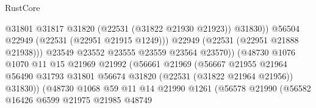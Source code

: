 \begin{lexlean}{RustCore}
\begin{coremodule}
                                                  @31801
                                                  @31817
                                                  @31820
                                                  (@22531 (@31822 @21930 @21923))
                                                  @31830))
                                              @56504
                                              @22949
                                              (@22531 (@22951 @21915 @1249)))
                                            @22949
                                            (@22531 (@22951 @21888 @21938)))
                                          @23549
                                          @23552
                                          @23555
                                          @23559
                                          @23564
                                          @23570))
                                      (@48730
                                        @1076
                                        @1070
                                        @11
                                        @15
                                        @21969
                                        @21992
                                        (@56661
                                          @21969
                                          (@56667
                                            @21955
                                            @21964
                                            @56490
                                            @31793
                                            @31801
                                            @56674
                                            @31820
                                            (@22531 (@31822 @21964 @21956))
                                            @31830))
                                        (@48730
                                          @1068
                                          @59
                                          @11
                                          @14
                                          @21990
                                          @1261
                                          (@56578
                                            @21990
                                            (@56582
                                              @16426
                                              @6599
                                              @21975
                                              @21985
                                              @48749

\end{coremodule}
\end{lexlean}
